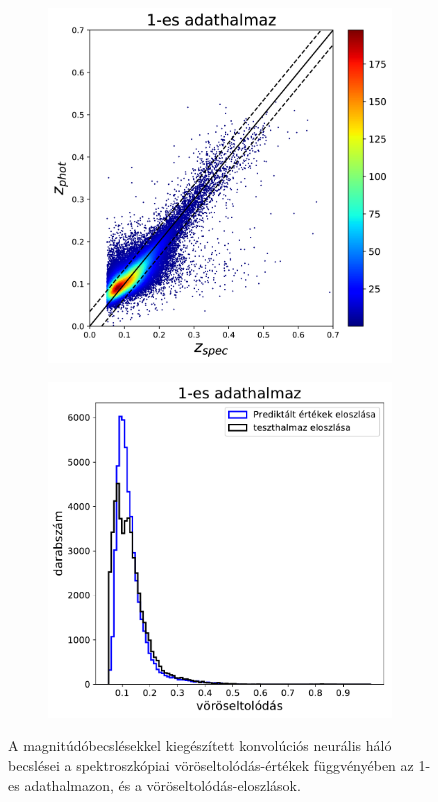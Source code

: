 \documentclass[12pt,letterpaper,oneside,openright]{book}
\begin{document}
\begin{figure}[]
 \centering
  \begin{subfigure}[b]{0.3\textwidth}
    \includegraphics[width=\textwidth, height = \textwidth]{Figures/plotCNN1M.png}
    \label{fig:1}
  \end{subfigure}
  \hspace{1.7cm}
  \begin{subfigure}[b]{0.3\textwidth}
    \includegraphics[width=\textwidth, height = \textwidth]{Figures/histCNN1M.pdf}
    \label{fig:2}
  \end{subfigure}
  \caption{A magnitúdóbecslésekkel kiegészített konvolúciós neurális háló becslései a spektroszkópiai vöröseltolódás-értékek függvényében az 1-es adathalmazon, és a vöröseltolódás-eloszlások.}
\label{cnnm}
\end{figure}
\end{document}
